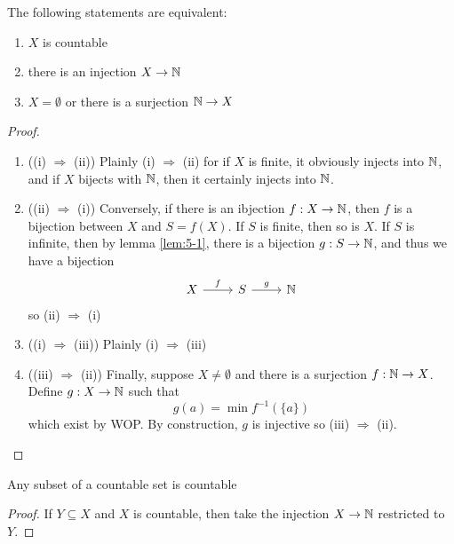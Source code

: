 \documentclass{article}
\begin{document}
\begin{nthm}\label{th:5-2}
    The following statements are equivalent:
    \begin{enumerate}
        \item $X$ is countable
        \item there is an injection $X \rightarrow \mathbb{N}$
        \item $X = \emptyset$ or there is a surjection $\mathbb{N} \rightarrow X$
    \end{enumerate}
\end{nthm}
\begin{proof}\leavevmode
    \begin{enumerate}[cases]
        \item ((i) $\Rightarrow$ (ii)) Plainly (i) $\Rightarrow$ (ii) for if $X$ is finite, it obviously injects into $\mathbb{N}$,
        and if $X$ bijects with $\mathbb{N}$, then it certainly injects into $\mathbb{N}$.

        \item ((ii) $\Rightarrow$ (i)) Conversely, if there is an ibjection $f: X \rightarrow \mathbb{N}$, then $f$ is a bijection between $X$ and $S = f(X)$.
        If $S$ is finite, then so is $X$. 
        If $S$ is infinite, then by lemma \ref{lem:5-1}, there is a bijection $g: S \rightarrow \mathbb{N}$, and thus we have a bijection
        \[
            \begin{tikzcd}
                X \arrow[r, "f"] & S \arrow[r, "g"] & \N
            \end{tikzcd}
        \]
        so (ii) $\Rightarrow$ (i)
        
        \item ((i) $\Rightarrow$ (iii)) Plainly (i) $\Rightarrow$ (iii)
        \item ((iii) $\Rightarrow$ (ii)) Finally, suppose $X \neq \emptyset$ and there is a surjection $f: \mathbb{N} \rightarrow X$.
        Define $g: X \rightarrow \mathbb{N}$ such that
        \[
            g(a) = \min f^{-1}(\{a\})
        \]
        which exist by WOP.
        By construction, $g$ is injective so (iii) $\Rightarrow$ (ii). 
    \end{enumerate}
\end{proof}

\begin{ncor}\label{cor:5-3}
    Any subset of a countable set is countable
\end{ncor}
\begin{proof}
    If $Y \subseteq X$ and $X$ is countable, then take the injection $X \rightarrow \mathbb{N}$ restricted to $Y$.
\end{proof}
\end{document}
